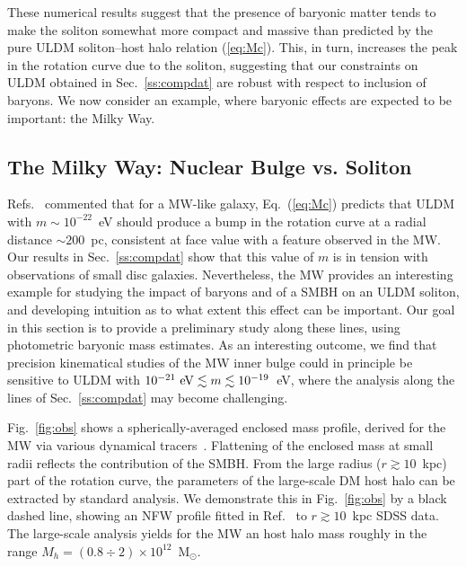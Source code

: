 \documentclass[aps,prd,floats,superscriptaddress,showpacs,nofootinbib,twocolumn,preprintnumbers]{revtex4-1}%
\begin{document}
These numerical results suggest that the presence of baryonic matter
tends to make the soliton somewhat more compact and massive than
predicted by the pure ULDM soliton--host halo relation
(\ref{eq:Mc}). This, in turn, increases the peak in the rotation curve
due to the soliton, suggesting that our constraints
on ULDM obtained in Sec.~\ref{ss:compdat} are robust with respect to inclusion
of baryons. We now consider an example, where baryonic
effects are expected to be important: the Milky Way.  


\subsection{The Milky Way: Nuclear Bulge vs. Soliton}\label{ss:MW}
%

Refs.~\cite{Schive:2014hza,Schive:2014dra} commented that for a
MW-like galaxy, Eq.~(\ref{eq:Mc}) predicts that ULDM with
$m\sim10^{-22}$~eV should produce a bump in the rotation curve at a
radial distance $\sim200$~pc, consistent at face value with a feature
observed in the MW.  Our results in
Sec.~\ref{ss:compdat} show that this value of $m$ is in tension with
observations of small disc galaxies. Nevertheless, the MW provides an
interesting example for studying the impact of  baryons and of a
SMBH on an ULDM soliton, and developing intuition as to what extent
this effect can be important. Our goal in this section is to provide a
preliminary study along these lines, using photometric baryonic mass
estimates. As an interesting outcome, we find that precision
kinematical studies of the MW inner bulge could in principle be
sensitive to ULDM with $10^{-21}~{\rm eV}\lesssim m \lesssim 10^{-19}$~eV, 
where the analysis along the lines of Sec.~\ref{ss:compdat}
may become challenging. 
%

Fig.~\ref{fig:obs} shows a spherically-averaged enclosed mass profile,
derived for the MW via various dynamical
tracers~\cite{Ghez2003,Feldmeier-Krause2017,McGinn1989,Lindqvist1992,Deguchi2004a,Trippe2008,Oh2009,Schoedel2014,Chatzopoulos2014,Fritz2016,Sofue2009,Sofue2012,Sofue2013,Chemin2015b}. 
Flattening of the enclosed mass at small radii reflects the
contribution of the SMBH. 
From the large radius ($r\gtrsim10$~kpc) part of the rotation curve, the parameters of the large-scale DM host halo can be extracted by standard analysis. We demonstrate this in Fig.~\ref{fig:obs} by a black dashed line, showing an NFW profile fitted in
Ref.~\cite{Piffl:2014mfa} to $r\gtrsim10$~kpc SDSS data. The large-scale analysis yields for the MW an host halo mass roughly in the range $M_h=(0.8\div 2)\times10^{12}$~M$_\odot$.
\end{document}

